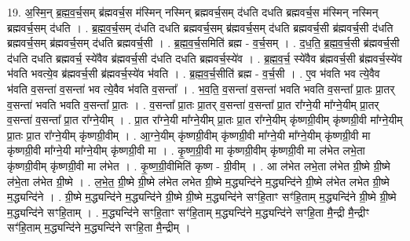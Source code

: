 \documentclass[17pt]{extarticle}
\begin{document}
19. अ॒स्मि॒न् ब्र॒ह्म॒व॒र्च॒सम् ब्र॑ह्मवर्च॒स म॑स्मिन् नस्मिन् ब्रह्मवर्च॒सम् द॑धति दधति ब्रह्मवर्च॒स म॑स्मिन् नस्मिन् ब्रह्मवर्च॒सम् द॑धति । . ब्र॒ह्म॒व॒र्च॒सम् द॑धति दधति ब्रह्मवर्च॒सम् ब्र॑ह्मवर्च॒सम् द॑धति ब्रह्मवर्च॒सी ब्र॑ह्मवर्च॒सी द॑धति ब्रह्मवर्च॒सम् ब्र॑ह्मवर्च॒सम् द॑धति ब्रह्मवर्च॒सी । . ब्र॒ह्म॒व॒र्च॒समिति॑ ब्रह्म - व॒र्च॒सम् । . द॒ध॒ति॒ ब्र॒ह्म॒व॒र्च॒सी ब्र॑ह्मवर्च॒सी द॑धति दधति ब्रह्मवर्च॒ स्ये॑वैव ब्र॑ह्मवर्च॒सी द॑धति दधति ब्रह्मवर्च॒स्ये॑व । . ब्र॒ह्म॒व॒र्च॒ स्ये॑वैव ब्र॑ह्मवर्च॒सी ब्र॑ह्मवर्च॒स्ये॑व भ॑वति भवत्ये॒व ब्र॑ह्मवर्च॒सी ब्र॑ह्मवर्च॒स्ये॑व भ॑वति । . ब्र॒ह्म॒व॒र्च॒सीति॑ ब्रह्म - व॒र्च॒सी । . ए॒व भ॑वति भव त्ये॒वैव भ॑वति व॒सन्ता॑ व॒सन्ता॑ भव त्ये॒वैव भ॑वति व॒सन्ता᳚ । . भ॒व॒ति॒ व॒सन्ता॑ व॒सन्ता॑ भवति भवति व॒सन्ता᳚ प्रा॒तः प्रा॒तर् व॒सन्ता॑ भवति भवति व॒सन्ता᳚ प्रा॒तः । . व॒सन्ता᳚ प्रा॒तः प्रा॒तर् व॒सन्ता॑ व॒सन्ता᳚ प्रा॒त रा᳚ग्ने॒यी मा᳚ग्ने॒यीम् प्रा॒तर् व॒सन्ता॑ व॒सन्ता᳚ प्रा॒त रा᳚ग्ने॒यीम् । . प्रा॒त रा᳚ग्ने॒यी मा᳚ग्ने॒यीम् प्रा॒तः प्रा॒त रा᳚ग्ने॒यीम् कृ॑ष्णग्री॒वीम् कृ॑ष्णग्री॒वी मा᳚ग्ने॒यीम् प्रा॒तः प्रा॒त रा᳚ग्ने॒यीम् कृ॑ष्णग्री॒वीम् । . आ॒ग्ने॒यीम् कृ॑ष्णग्री॒वीम् कृ॑ष्णग्री॒वी मा᳚ग्ने॒यी मा᳚ग्ने॒यीम् कृ॑ष्णग्री॒वी मा कृ॑ष्णग्री॒वी मा᳚ग्ने॒यी मा᳚ग्ने॒यीम् कृ॑ष्णग्री॒वी मा । . कृ॒ष्ण॒ग्री॒वी मा कृ॑ष्णग्री॒वीम् कृ॑ष्णग्री॒वी मा ल॑भेत लभे॒ता कृ॑ष्णग्री॒वीम् कृ॑ष्णग्री॒वी मा ल॑भेत । . कृ॒ष्ण॒ग्री॒वीमिति॑ कृष्ण - ग्री॒वीम् । . आ ल॑भेत लभे॒ता ल॑भेत ग्री॒ष्मे ग्री॒ष्मे ल॑भे॒ता ल॑भेत ग्री॒ष्मे । . ल॒भे॒त॒ ग्री॒ष्मे ग्री॒ष्मे ल॑भेत लभेत ग्री॒ष्मे म॒द्ध्यन्दि॑ने म॒द्ध्यन्दि॑ने ग्री॒ष्मे ल॑भेत लभेत ग्री॒ष्मे म॒द्ध्यन्दि॑ने । . ग्री॒ष्मे म॒द्ध्यन्दि॑ने म॒द्ध्यन्दि॑ने ग्री॒ष्मे ग्री॒ष्मे म॒द्ध्यन्दि॑ने सꣳहि॒ताꣳ सꣳ॑हि॒ताम् म॒द्ध्यन्दि॑ने ग्री॒ष्मे ग्री॒ष्मे म॒द्ध्यन्दि॑ने सꣳहि॒ताम् । . म॒द्ध्यन्दि॑ने सꣳहि॒ताꣳ सꣳ॑हि॒ताम् म॒द्ध्यन्दि॑ने म॒द्ध्यन्दि॑ने सꣳहि॒ता मै॒न्द्री मै॒न्द्रीꣳ सꣳ॑हि॒ताम् म॒द्ध्यन्दि॑ने म॒द्ध्यन्दि॑ने सꣳहि॒ता मै॒न्द्रीम् । \newline
\end{document}
